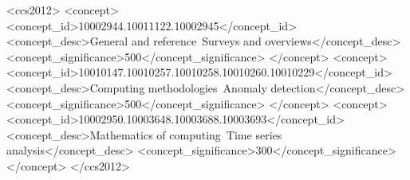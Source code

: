 \documentclass[format=acmsmall, screen=true]{acmart}
\begin{document}
    


\begin{CCSXML}
<ccs2012>
<concept>
<concept_id>10002944.10011122.10002945</concept_id>
<concept_desc>General and reference~Surveys and overviews</concept_desc>
<concept_significance>500</concept_significance>
</concept>
<concept>
<concept_id>10010147.10010257.10010258.10010260.10010229</concept_id>
<concept_desc>Computing methodologies~Anomaly detection</concept_desc>
<concept_significance>500</concept_significance>
</concept>
<concept>
<concept_id>10002950.10003648.10003688.10003693</concept_id>
<concept_desc>Mathematics of computing~Time series analysis</concept_desc>
<concept_significance>300</concept_significance>
</concept>
</ccs2012>
\end{CCSXML}


\author{Edward Toth}
%
\author{Sanjay Chawla }
 

%

% 
\end{document}
